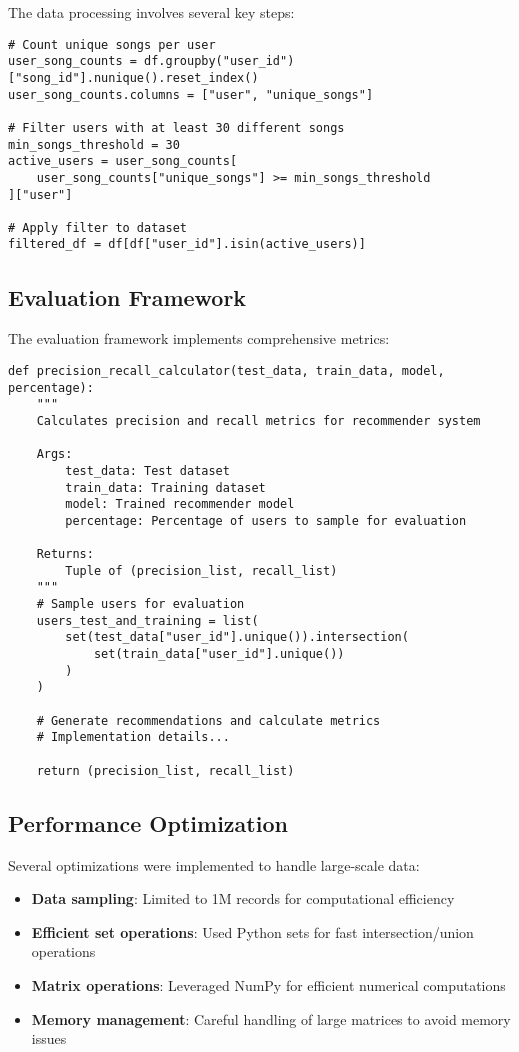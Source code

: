 \documentclass[12pt,a4paper]{article}
\begin{document}
The data processing involves several key steps:

\begin{lstlisting}[caption=Data Filtering Process]
# Count unique songs per user
user_song_counts = df.groupby("user_id")["song_id"].nunique().reset_index()
user_song_counts.columns = ["user", "unique_songs"]

# Filter users with at least 30 different songs
min_songs_threshold = 30
active_users = user_song_counts[
    user_song_counts["unique_songs"] >= min_songs_threshold
]["user"]

# Apply filter to dataset
filtered_df = df[df["user_id"].isin(active_users)]
\end{lstlisting}

\subsection{Evaluation Framework}

The evaluation framework implements comprehensive metrics:

\begin{lstlisting}[caption=Precision-Recall Calculation Framework]
def precision_recall_calculator(test_data, train_data, model, percentage):
    """
    Calculates precision and recall metrics for recommender system
    
    Args:
        test_data: Test dataset
        train_data: Training dataset  
        model: Trained recommender model
        percentage: Percentage of users to sample for evaluation
    
    Returns:
        Tuple of (precision_list, recall_list)
    """
    # Sample users for evaluation
    users_test_and_training = list(
        set(test_data["user_id"].unique()).intersection(
            set(train_data["user_id"].unique())
        )
    )
    
    # Generate recommendations and calculate metrics
    # Implementation details...
    
    return (precision_list, recall_list)
\end{lstlisting}

\subsection{Performance Optimization}

Several optimizations were implemented to handle large-scale data:

\begin{itemize}
    \item \textbf{Data sampling}: Limited to 1M records for computational efficiency
    \item \textbf{Efficient set operations}: Used Python sets for fast intersection/union operations
    \item \textbf{Matrix operations}: Leveraged NumPy for efficient numerical computations
    \item \textbf{Memory management}: Careful handling of large matrices to avoid memory issues
\end{itemize}
\end{document}
